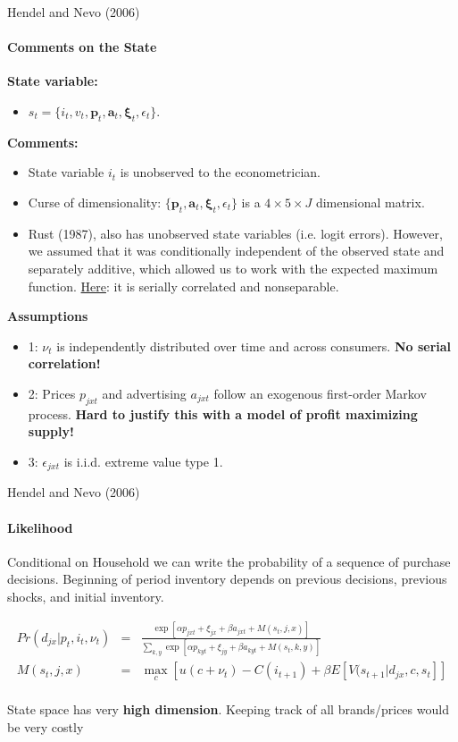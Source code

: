 \documentclass[11pt,aspectratio=169]{beamer}
\begin{document}
\begin{frame}{Hendel and Nevo (2006)}
\framesubtitle{Comments on the State}
\small

\textbf{State variable:}
\begin{itemize}\footnotesize
\item[$-$] $s_t = \{i_t,v_t,\mathbf{p}_t,\mathbf{a}_t,\mathbf{\xi}_t,\epsilon_t\}$.
\end{itemize}    

\textbf{Comments:}
\begin{itemize}\footnotesize
\item[$-$] State variable $i_t$ is unobserved to the econometrician.
\item[$-$] Curse of dimensionality: $\{\mathbf{p}_t,\mathbf{a}_t,\mathbf{\xi}_t,\epsilon_t\}$ is a $4 \times 5 \times J$ dimensional matrix.
\item[$-$] Rust (1987), also has unobserved state variables (i.e. logit
errors). However, we assumed that it was conditionally independent of
the observed state and separately additive, which allowed us to work with
the expected maximum function. \underline{Here}: it is serially correlated and nonseparable.
\end{itemize}  


\textbf{Assumptions}
\begin{itemize}\footnotesize
\item 1: $\nu_t$ is independently distributed over time and across consumers. \textbf{No serial correlation!}

\item 2: Prices $p_{jxt}$ and advertising $a_{jxt}$ follow an exogenous first-order Markov process. \textbf{Hard to justify this with a model of profit maximizing supply!}
\item 3: $\epsilon_{jxt}$ is i.i.d. extreme value type 1.
\end{itemize}

\end{frame}



\begin{frame}{Hendel and Nevo (2006)}
\framesubtitle{Likelihood}\small
Conditional on Household we can write the probability of a sequence of purchase decisions. Beginning of period inventory depends on previous decisions, previous shocks, and initial inventory.

\begin{eqnarray*}
Pr(d_{jx} | p_t,i_t,\nu_t) &=& \frac{\exp[\alpha p_{jxt} + \xi_{jx} + \beta a_{jxt} + M(s_t,j,x)]}{\sum_{k,y} \exp[\alpha p_{kyt} + \xi_{jy} + \beta a_{kyt} + M(s_t,k,y)]}\\
M (s_t,j,x) &=& \max_c [ u(c+\nu_t) - C(i_{t+1}) + \beta E[V(s_{t+1}|d_{jx},c,s_t]]\\
\end{eqnarray*}

State space has very \textbf{high dimension}. Keeping track of all brands/prices would be very costly

\end{frame}
\end{document}
